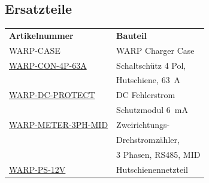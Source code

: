 \documentclass[a4paper,10pt]{article}
\begin{document}
\begin{multicols*}{2}
	\subsection{Ersatzteile}
	\begin{tabular}{ll}
		\textbf{Artikelnummer}                                                                                                   & \textbf{Bauteil}                                              \\
		\cmidrule(lr{0.5em}){1-2}
		WARP-CASE                                                                                                                & WARP Charger Case                                             \\
		\cmidrule(lr{0.5em}){1-2}
		\href{https://www.tinkerforge.com/de/shop/warp/contactor-4-pole-din-rail-63a.html}{WARP-CON-4P-63A}                      & Schaltschütz 4 Pol,                                           \\
		                                                                                                                         & Hutschiene, \SI{63}{\ampere}                                  \\
		\cmidrule(lr{0.5em}){1-2}
		\href{https://www.tinkerforge.com/de/shop/warp/dc-residual-current-protection-module-6ma.html}{WARP-DC-PROTECT}          & DC Fehlerstrom                                                \\
		                                                                                                                         & Schutzmodul \SI{6}{\milli\ampere}                             \\
		\cmidrule(lr{0.5em}){1-2}
		\href{https://www.tinkerforge.com/de/shop/warp/bidirectional-polyphase-meter-3-phase-rs485-mid.html}{WARP-METER-3PH-MID} & Zweirichtungs-                                                \\
		                                                                                                                         & Drehstromzähler,                                              \\
		                                                                                                                         & 3 Phasen, RS485, MID                                          \\
		\cmidrule(lr{0.5em}){1-2}
		\href{https://www.tinkerforge.com/de/shop/warp/din-rail-power-supply-230vac-12vdc-1-25a.html}{WARP-PS-12V}               & Hutschienennetzteil                                           \\

\end{tabular}
\end{multicols*}
\end{document}
